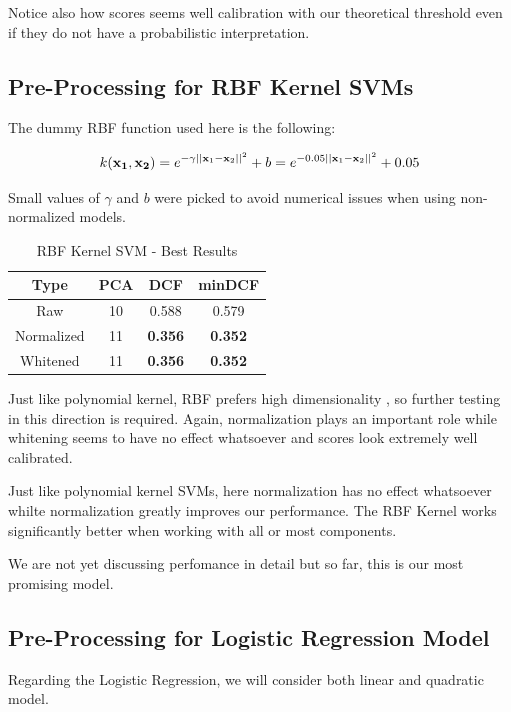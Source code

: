 \documentclass[12pt, twocolumn]{article}
\begin{document}
Notice also how scores seems well calibration with our theoretical threshold even if they do not have a probabilistic interpretation.

\subsection{Pre-Processing for RBF Kernel SVMs}

The dummy RBF function used here is the following:

$$\displaystyle k({\bf x_1}, {\bf x_2}) = e^{-\gamma||{\bf x}_1 - {\bf x}_2||^2} + b = e^{-0.05||{\bf x}_1 - {\bf x}_2||^2} + 0.05 $$

Small values of $\gamma$ and $b$ were picked to avoid numerical issues when using non-normalized models.

\begin{table}[H]
    \centering
        \begin{tabular}{||c|c|c|c||}
            \hline
            Type & PCA & DCF & minDCF \\
            \hline
            \hline
                Raw & 10 & 0.588 & 0.579 \\ 
                Normalized & 11 & {\bf 0.356} & {\bf 0.352} \\ 
                Whitened & 11 & {\bf 0.356} & {\bf 0.352} \\ 
            \hline
    \end{tabular}
    \caption{RBF Kernel SVM - Best Results}
\end{table}

Just like polynomial kernel, RBF prefers high dimensionality , so further testing in this direction is required.
Again, normalization plays an important role while whitening seems to have no effect whatsoever and scores look extremely well calibrated.

Just like polynomial kernel SVMs, here normalization has no effect whatsoever whilte normalization greatly improves our performance.
The RBF Kernel works significantly better when working with all or most components. 

We are not yet discussing perfomance in detail but so far, this is our most promising model.

\subsection{Pre-Processing for Logistic Regression Model}

Regarding the Logistic Regression, we will consider both linear and quadratic model.
\end{document}
